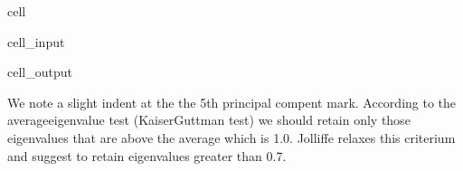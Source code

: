 \documentclass[letterpaper,10pt,english]{jupyterBook}
\begin{document}
\begin{sphinxuseclass}{cell}\begin{sphinxVerbatimInput}

\begin{sphinxuseclass}{cell_input}
\begin{sphinxVerbatim}[commandchars=\\\{\}]
  
\end{sphinxVerbatim}

\end{sphinxuseclass}\end{sphinxVerbatimInput}
\begin{sphinxVerbatimOutput}

\begin{sphinxuseclass}{cell_output}
\noindent{}

\end{sphinxuseclass}\end{sphinxVerbatimOutput}

\end{sphinxuseclass}
\sphinxAtStartPar
We note a slight indent at the the 5th principal compent mark. According to the average\sphinxhyphen{}eigenvalue test (Kaiser\sphinxhyphen{}Guttman test) we should retain only those eigenvalues that are above the average which is 1.0. 
Jolliffe relaxes this criterium and suggest to retain eigenvalues greater than 0.7.
\end{document}
